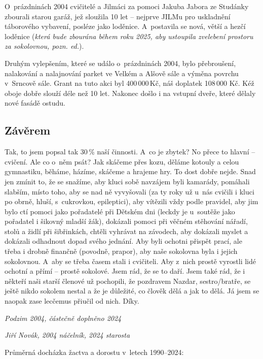 \documentclass[a5paper, 11pt, twoside]{article}
\begin{document}
O~prázdninách 2004 cvičitelé a Jilmáci za pomoci Jakuba Jabora ze
Studánky zbourali starou garáž, jež sloužila 10 let -- nejprve JILMu pro
uskladnění táborového vybavení, posléze jako loděnice. A~postavila se
nová, větší a hezčí loděnice (\textit{která bude zbourána během roku 2025,
aby ustoupila zvelebení prostoru za sokolovnou, pozn. ed.}).

Druhým vylepšením, které se událo o~prázdninách 2004, bylo přebroušení,
nalakování a nalajnování parket ve Velkém a Alšově sále a výměna povrchu
v~Srncově sále. Grant na tuto akci byl 400\,000\,Kč, náš doplatek 108\,000
Kč. Kéž oboje dobře slouží déle než 10 let. Nakonec došlo i na vstupní
dveře, které dělaly nové fasádě ostudu.

\subsection{Závěrem}

Tak, to jsem popsal tak 30\,\% naší činnosti. A~co je zbytek? No přece to
hlavní -- cvičení. Ale co o~něm psát? Jak skáčeme přes kozu, děláme
kotouly a celou gymnastiku, běháme, házíme, skáčeme a hrajeme hry. To
dost dobře nejde. Snad jen zmínit to, že se snažíme, aby kluci sobě
navzájem byli kamarády, pomáhali slabším, místo toho, aby se nad ně
vyvyšovali (za ty roky už u~nás cvičili i kluci po obrně, hluší,
s~cukrovkou, epileptici), aby vítězili vždy podle pravidel, aby jim bylo
ctí pomoci jako pořadatelé při Dětském dni (leckdy je u~soutěže jako
pořadatel i šikovný mladší žák), dokázali pomoci při věčném stěhování
nářadí, stolů a židlí při šibřinkách, chtěli vyhrávat na závodech, aby
dokázali myslet a dokázali odhadnout dopad svého jednání. Aby byli
ochotni přispět prací, ale třeba i drobně finančně (povodně, prapor),
aby naše sokolovna byla i jejich sokolovnou. A~aby se třeba časem stali
i cvičiteli. Aby z~nich prostě vyrostli lidé ochotní a přímí -- prostě
sokolové. Jsem rád, že se to daří. Jsem také rád, že i někteří naši
starší členové už pochopili, že pozdravem Nazdar, sestro/bratře, se
ještě nikdo sokolem nestal a že je důležité, co člověk dělá a jak to
dělá. Já jsem se naopak zase lecčemus přiučil od nich. Díky.

\medskip
\hfill\textit{Podzim 2004, částečně doplněno 2024}

\hfill\textit{Jiří Novák, 2004 náčelník, 2024 starosta}

\medskip
\noindent Průměrná docházka žactva a dorostu v~letech 1990--2024:
\end{document}
